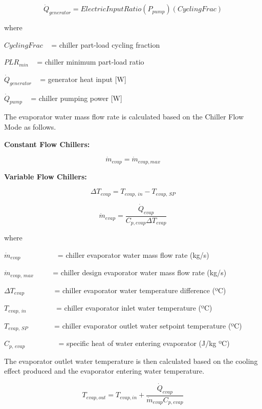 \begin{equation}
{\dot Q_{generator}} = ElectricInputRatio({P_{pump}})(CyclingFrac)
\end{equation}

where

\(CyclingFrac\) ~ = chiller part-load cycling fraction

\(PL{R_{min}}\) ~ = chiller minimum part-load ratio

\({\dot Q_{generator}}\) ~ = generator heat input {[}W{]}

\({\dot Q_{pump}}\) ~ = chiller pumping power {[}W{]}

The evaporator water mass flow rate is calculated based on the Chiller Flow Mode as follows.

\textbf{Constant Flow Chillers:}

\begin{equation}
{\dot m_{evap}} = {\dot m_{evap,max}}
\end{equation}

\textbf{Variable Flow Chillers:}

\begin{equation}
\Delta {T_{evap}} = {T_{evap,\,in}} - {T_{evap,\,SP}}
\end{equation}

\begin{equation}
  \dot m_{evap} = \frac{\dot{Q}_{evap}}{C_{p,evap}\Delta T_{evap}}
\end{equation}

where

\({\dot m_{evap}}\) ~~~~~~~~~ = chiller evaporator water mass flow rate (kg/s)

\({\dot m_{evap,\,max}}\) ~~~~ = chiller design evaporator water mass flow rate (kg/s)

\(\Delta {T_{evap}}\) ~~~~~~~ = chiller evaporator water temperature difference (ºC)

\({T_{evap,\,in}}\) ~~~~~~~ = chiller evaporator inlet water temperature (ºC)

\({T_{evap,\,SP}}\) ~~~~~~ = chiller evaporator outlet water setpoint temperature (ºC)

\({C_{p,\,evap}}\) ~~~~~~~~ = specific heat of water entering evaporator (J/kg ºC)

The evaporator outlet water temperature is then calculated based on the cooling effect produced and the evaporator entering water temperature.

\begin{equation}
  T_{evap,out} = T_{evap,in} + \frac{\dot{Q}_{evap}}{\dot{m}_{evap}C_{p,evap}}
\end{equation}

